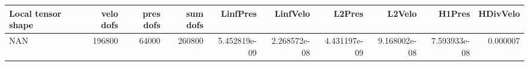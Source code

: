 \begin{tabular}{lrrrrrrrrr}
\toprule
Local tensor shape &  velo dofs &  pres dofs &  sum dofs &     LinfPres &     LinfVelo &       L2Pres &       L2Velo &       H1Pres &  HDivVelo \\
\midrule
               NAN &     196800 &      64000 &    260800 & 5.452819e-09 & 2.268572e-08 & 4.431197e-09 & 9.168002e-08 & 7.593933e-08 &  0.000007 \\
\bottomrule
\end{tabular}

